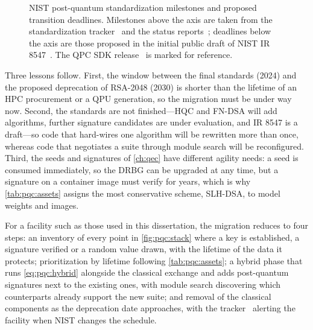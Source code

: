 \begin{figure}[htbp]
\caption{NIST post-quantum standardization milestones and proposed transition deadlines. Milestones above the axis are taken from the standardization tracker~\cite{guo2026nisttracker} and the status reports~\cite{nist2022ir8413,nist2025ir8545}; deadlines below the axis are those proposed in the initial public draft of NIST IR 8547~\cite{nist2024ir8547}. The QPC SDK release~\cite{guo2026lightriderqpc} is marked for reference.}
\label{fig:pqc:timeline}
\end{figure}

Three lessons follow. First, the window between the final standards (2024) and the proposed deprecation of RSA-2048 (2030) is shorter than the lifetime of an HPC procurement or a QPU generation, so the migration must be under way now. Second, the standards are not finished---HQC and FN-DSA will add algorithms, further signature candidates are under evaluation, and IR 8547 is a draft---so code that hard-wires one algorithm will be rewritten more than once, whereas code that negotiates a suite through module search will be reconfigured. Third, the seeds and signatures of \cref{ch:qec} have different agility needs: a seed is consumed immediately, so the DRBG can be upgraded at any time, but a signature on a container image must verify for years, which is why \cref{tab:pqc:assets} assigns the most conservative scheme, SLH-DSA, to model weights and images.

For a facility such as those used in this dissertation, the migration reduces to four steps: an inventory of every point in \cref{fig:pqc:stack} where a key is established, a signature verified or a random value drawn, with the lifetime of the data it protects; prioritization by lifetime following \cref{tab:pqc:assets}; a hybrid phase that runs \cref{eq:pqc:hybrid} alongside the classical exchange and adds post-quantum signatures next to the existing ones, with module search discovering which counterparts already support the new suite; and removal of the classical components as the deprecation date approaches, with the tracker~\cite{guo2026nisttracker} alerting the facility when NIST changes the schedule.


